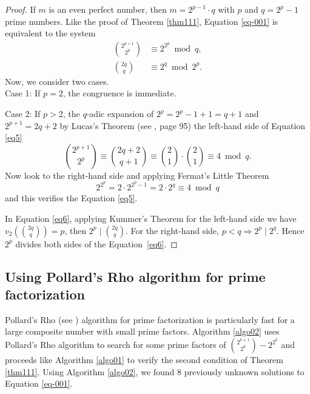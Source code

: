 \documentclass[11pt,a4paper]{article}
\begin{document}
\begin{proof}
If $m$ is an even perfect number, then $m=2^{p-1}\cdot q$ with $p$ and $q=2^p-1$ prime numbers. Like the proof of Theorem \ref{thm111}, Equation \eqref{eq-001} is equivalent to the system
\begin{align}
\binom{2^{p+1}}{2^{p}}&\equiv 2^{2^p} \bmod {q}  \label{eq5}, \\ 
\binom{2q}{q}&\equiv 2^q \bmod {2^p}\label{eq6}.
\end{align}
Now, we consider two cases. \\
Case 1: If $p=2$, the congruence is immediate.


\noindent
Case 2: If $p>2$, the $q$-adic expansion of $2^p=2^p-1+1=q+1$ and $2^{p+1}=2q+2$ by Lucas's Theorem (see \cite{CHENCHUAN}, page 95) the left-hand side of Equation \eqref{eq5}
\begin{equation*}
    \binom{2^{p+1}}{2^{p}}\equiv \binom{2q+2}{q+1}\equiv \binom{2}{1}\cdot\binom{2}{1}\equiv 4 \bmod {q}. 
\end{equation*}
Now look to the right-hand side and applying Fermat's Little Theorem
\begin{equation*}
 2^{2^p}=2\cdot 2^{2^p-1}=2\cdot2^q\equiv4 \bmod {q}    
 \end{equation*}
and this verifies the Equation \eqref{eq5}.

In Equation \eqref{eq6}, applying Kummer's Theorem for the left-hand side  we have $v_2\left(\binom{2q}{q}\right)=p$, then $2^p  \mid   \binom{2q}{q}$. For the right-hand side, $p<q\Rightarrow2^p \mid 2^q$. Hence $2^p$ divides both sides of the Equation~\eqref{eq6}.
\end{proof}


\subsection{Using Pollard's Rho algorithm for prime factorization}


Pollard's Rho (see \cite{CORMEN}) algorithm for prime factorization is particularly fast for a large composite number with small prime factors.   Algorithm \ref{algo02} uses Pollard’s Rho algorithm to search for some prime factors of $\binom{2^{k+1}}{2^k}-2^{2^k}$ and proceeds like Algorithm \ref{algo01} to verify the second condition of Theorem \ref{thm111}. Using Algorithm \ref{algo02}, we found 8 previously unknown solutions to Equation \eqref{eq-001}.  
\end{document}
